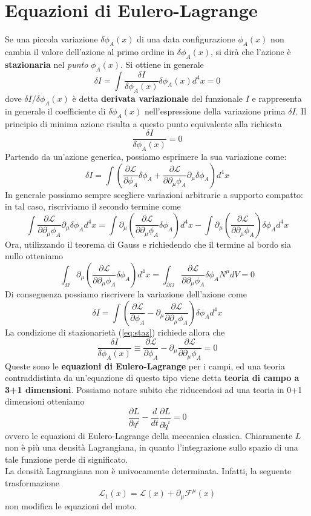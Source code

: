 \documentclass[a4paper,11pt]{book}
\theoremstyle{plain}
\theoremstyle{definition}
\begin{document}
\section{Equazioni di Eulero-Lagrange}
Se una piccola variazione $\delta\phi_A(x)$ di una data configurazione $\phi_A(x)$ non cambia il valore dell'azione al primo ordine in $\delta\phi_A(x)$, si dirà che l'azione è \textbf{stazionaria} nel \emph{punto} $\phi_A(x)$. Si ottiene in generale
\[
\delta I = \int \frac{\delta I}{\delta \phi_A(x)}\delta\phi_A(x)d^4x = 0
\]
dove $\delta I / \delta\phi_A(x)$ è detta \textbf{derivata variazionale} del funzionale $I$ e rappresenta in generale il coefficiente di $\delta\phi_A(x)$ nell'espressione della variazione prima $\delta I$. Il principio di minima azione risulta a questo punto equivalente alla richiesta
\begin{equation}\label{eq:staz}
\frac{\delta I}{\delta \phi_A(x)}=0
\end{equation}
Partendo da un'azione generica, possiamo esprimere la sua variazione come:
\[
\delta I = \int \left( \frac{\partial \mathcal{L}}{\partial \phi_A}\delta \phi_A +\frac{\partial \mathcal{L}}{\partial \partial_{\mu}\phi_A}\partial_{\mu}\delta\phi_A\right)d^4x
\]
In generale possiamo sempre scegliere variazioni arbitrarie a supporto compatto: in tal caso, riscriviamo il secondo termine come
\[
\int \frac{\partial \mathcal{L}}{\partial \partial_{\mu}\phi_A}\partial_{\mu}\delta\phi_Ad^4x = \int \partial_{\mu} \left( \frac{\partial \mathcal{L}}{\partial \partial_{\mu}\phi_A}\delta\phi_A \right)d^4x - \int \partial_{\mu} \left(\frac{\partial \mathcal{L}}{\partial \partial_{\mu}\phi_A} \right)\delta\phi_Ad^4x
\]
Ora, utilizzando il teorema di Gauss e richiedendo che il termine al bordo sia nullo otteniamo
\[
\int_{\Omega} \partial_{\mu} \left( \frac{\partial \mathcal{L}}{\partial \partial_{\mu}\phi_A}\delta\phi_A \right)d^4x = \int_{\partial\Omega} \frac{\partial \mathcal{L}}{\partial \partial_{\mu}\phi_A}\delta\phi_AN^{\mu}dV =0
\]
Di conseguenza possiamo riscrivere la variazione dell'azione come
\[
\delta I = \int \left( \frac{\partial \mathcal{L}}{\partial \phi_A} - \partial_{\mu} \frac{\partial \mathcal{L}}{\partial \partial_{\mu}\phi_A}  \right) \delta\phi_Ad^4x
\]
La condizione di stazionarietà (\ref{eq:staz}) richiede allora che
\[
\frac{\delta I}{\delta \phi_A(x)} \equiv \frac{\partial \mathcal{L}}{\partial \phi_A} - \partial_{\mu} \frac{\partial \mathcal{L}}{\partial \partial_{\mu}\phi_A}  = 0
\]
Queste sono le \textbf{equazioni di Eulero-Lagrange} per i campi, ed una teoria contraddistinta da un'equazione di questo tipo viene detta \textbf{teoria di campo a 3+1 dimensioni}. Possiamo notare subito che riducendosi ad una teoria in 0+1 dimensioni otteniamo 
\[
\frac{\partial L}{\partial q^i}-\frac{d}{dt}\frac{\partial L}{\partial \dot q^i}=0
\]
ovvero le equazioni di Eulero-Lagrange della meccanica classica. Chiaramente $L$ non è più una densità Lagrangiana, in quanto l'integrazione sullo spazio di una tale funzione perde di significato. \\
La densità Lagrangiana non è univocamente determinata. Infatti, la seguente trasformazione
\[
\mathcal{L}_1(x) = \mathcal{L}(x)+\partial_{\mu}\mathcal{F}^{\mu}(x)
\]
non modifica le equazioni del moto. 
\end{document}
